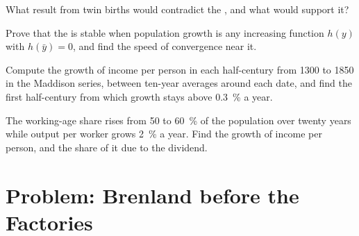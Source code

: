 \begin{exercise}[$\star\star$]\label{exo:b3:demographic-transition:9}
What result from twin births would contradict the , and
what would support it?
\end{exercise}

\begin{exercise}[$\star\star\star$]\label{exo:b3:demographic-transition:10}
Prove that the  is stable when population growth is any
increasing function $h(y)$ with $h(\bar y) = 0$, and find the speed of convergence near it.
\end{exercise}

\begin{exercise}[$\star\star\star$]\label{exo:b3:demographic-transition:11}
Compute the growth of income per person in each half-century from 1300 to 1850 in the
Maddison series, between ten-year averages around each date, and find the first half-century from which growth stays above 0.3~\% a year.
\end{exercise}

\begin{exercise}[$\star\star\star$]\label{exo:b3:demographic-transition:12}
The working-age share rises from 50 to 60~\% of the population over twenty years while output
per worker grows 2~\% a year. Find the growth of income per person, and the share of it due to
the dividend.
\end{exercise}

\section{Problem: Brenland before the Factories}\label{sec:b3:demographic-transition:problem}

